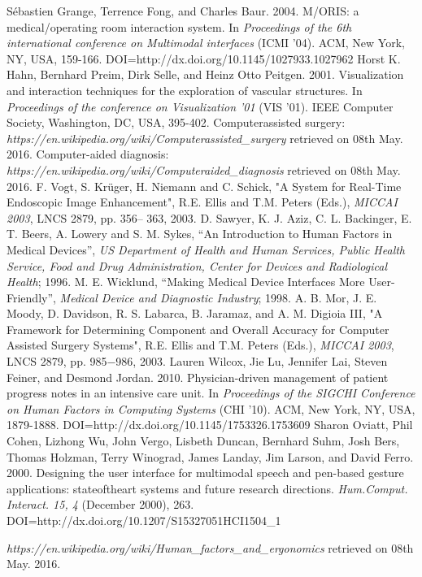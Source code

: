 \begin{thebibliography}{}
\bibitem{} Sébastien Grange, Terrence Fong, and Charles Baur. 2004. M/ORIS: a medical/operating room interaction system. In \emph{Proceedings of the 6th international conference on Multimodal interfaces} (ICMI '04). ACM, New York, NY, USA, 159-166. DOI=http://dx.doi.org/10.1145/1027933.1027962
\bibitem{} Horst K. Hahn, Bernhard Preim, Dirk Selle, and Heinz Otto Peitgen. 2001. Visualization and interaction techniques for the exploration of vascular structures. In \emph{Proceedings of the conference on Visualization '01} (VIS '01). IEEE Computer Society, Washington, DC, USA, 395-402.
\bibitem{} Computer\-assisted surgery: \emph{https://en.wikipedia.org/wiki/Computer\-assisted\_surgery} retrieved on 08th May. 2016.
\bibitem{} Computer-aided diagnosis: \emph{https://en.wikipedia.org/wiki/Computer\-aided\_diagnosis} retrieved on 08th May. 2016.
\bibitem{} F. Vogt, S. Krüger, H. Niemann and C. Schick, "A System
for Real-Time Endoscopic Image Enhancement", R.E. Ellis
and T.M. Peters (Eds.), \emph{MICCAI 2003}, LNCS 2879, pp. 356–
363, 2003.
\bibitem{} D. Sawyer, K. J. Aziz, C. L. Backinger, E. T. Beers, A.
Lowery and S. M. Sykes, “An Introduction to Human
Factors in Medical Devices”, \emph{US Department of Health and
Human Services, Public Health Service, Food and Drug
Administration, Center for Devices and Radiological Health}; 1996.
\bibitem{} M. E. Wicklund, “Making Medical Device Interfaces More
User-Friendly”, \emph{Medical Device and Diagnostic Industry}; 1998.
\bibitem{} A. B. Mor, J. E. Moody, D. Davidson, R. S. Labarca, B.
Jaramaz, and A. M. Digioia III, "A Framework for
Determining Component and Overall Accuracy for
Computer Assisted Surgery Systems", R.E. Ellis and T.M.
Peters (Eds.), \emph{MICCAI 2003}, LNCS 2879, pp. 985−986,
2003.
\bibitem{} Lauren Wilcox, Jie Lu, Jennifer Lai, Steven Feiner, and Desmond Jordan. 2010. Physician-driven management of patient progress notes in an intensive care unit. In \emph{Proceedings of the SIGCHI Conference on Human Factors in Computing Systems} (CHI '10). ACM, New York, NY, USA, 1879-1888. DOI=http://dx.doi.org/10.1145/1753326.1753609
\bibitem{} Sharon Oviatt, Phil Cohen, Lizhong Wu, John Vergo, Lisbeth Duncan, Bernhard Suhm, Josh Bers, Thomas Holzman, Terry Winograd, James Landay, Jim Larson, and David Ferro. 2000. Designing the user interface for multimodal speech and pen-based gesture applications: state\-of\-the\-art systems and future research directions. \emph{Hum.\-Comput. Interact. 15, 4} (December 2000), 263. DOI=http://dx.doi.org/10.1207/S15327051HCI1504\_1

\bibitem{} \emph{https://en.wikipedia.org/wiki/Human\_factors\_and\_ergonomics} retrieved on 08th May. 2016.
\end{thebibliography}
